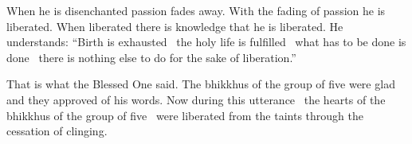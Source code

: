 \begin{english-only-hang}
  When he is disenchanted passion fades away. With the fading of passion he is liberated. When liberated there is knowledge that he is liberated. He understands: ``Birth is exhausted \breathmark\ the holy life is fulfilled \breathmark\ what has to be done is done \breathmark\ there is nothing else to do for the sake of liberation.''\hyperlink{endnote112-appendix}{\hypertarget{endnote112-body}{}}
\end{english-only-hang}

\clearpage

\begin{english-only-hang}
  That is what the Blessed One said. The bhikkhus of the group of five were glad and they approved of his words. Now during this utterance \breathmark\ the hearts of the bhikkhus of the group of five \breathmark\ were liberated from the taints through the cessation of clinging.
\end{english-only-hang}

\suttaRef{[SN 22.59]}

